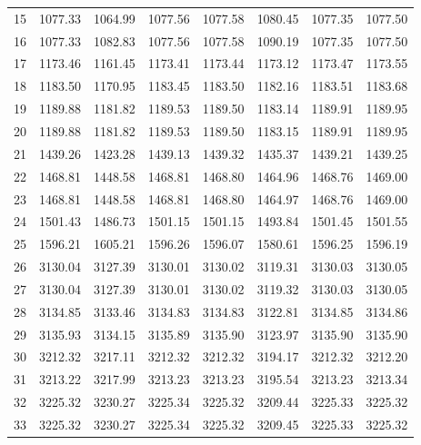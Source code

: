 \documentclass[10pt,oneside]{article}
\begin{document}
\begin{table}[h!]
\begin{tabular}{cccccccc}
15 &   1077.33 & 1064.99 & 1077.56 &    1077.58 &      1080.45 & 1077.35 &   1077.50 \\
16 &   1077.33 & 1082.83 & 1077.56 &    1077.58 &      1090.19 & 1077.35 &   1077.50 \\
17 &   1173.46 & 1161.45 & 1173.41 &    1173.44 &      1173.12 & 1173.47 &   1173.55 \\
18 &   1183.50 & 1170.95 & 1183.45 &    1183.50 &      1182.16 & 1183.51 &   1183.68 \\
19 &   1189.88 & 1181.82 & 1189.53 &    1189.50 &      1183.14 & 1189.91 &   1189.95 \\
20 &   1189.88 & 1181.82 & 1189.53 &    1189.50 &      1183.15 & 1189.91 &   1189.95 \\
21 &   1439.26 & 1423.28 & 1439.13 &    1439.32 &      1435.37 & 1439.21 &   1439.25 \\
22 &   1468.81 & 1448.58 & 1468.81 &    1468.80 &      1464.96 & 1468.76 &   1469.00 \\
23 &   1468.81 & 1448.58 & 1468.81 &    1468.80 &      1464.97 & 1468.76 &   1469.00 \\
24 &   1501.43 & 1486.73 & 1501.15 &    1501.15 &      1493.84 & 1501.45 &   1501.55 \\
25 &   1596.21 & 1605.21 & 1596.26 &    1596.07 &      1580.61 & 1596.25 &   1596.19 \\
26 &   3130.04 & 3127.39 & 3130.01 &    3130.02 &      3119.31 & 3130.03 &   3130.05 \\
27 &   3130.04 & 3127.39 & 3130.01 &    3130.02 &      3119.32 & 3130.03 &   3130.05 \\
28 &   3134.85 & 3133.46 & 3134.83 &    3134.83 &      3122.81 & 3134.85 &   3134.86 \\
29 &   3135.93 & 3134.15 & 3135.89 &    3135.90 &      3123.97 & 3135.90 &   3135.90 \\
30 &   3212.32 & 3217.11 & 3212.32 &    3212.32 &      3194.17 & 3212.32 &   3212.20 \\
31 &   3213.22 & 3217.99 & 3213.23 &    3213.23 &      3195.54 & 3213.23 &   3213.34 \\
32 &   3225.32 & 3230.27 & 3225.34 &    3225.32 &      3209.44 & 3225.33 &   3225.32 \\
33 &   3225.32 & 3230.27 & 3225.34 &    3225.32 &      3209.45 & 3225.33 &   3225.32 \\
\bottomrule
\end{tabular}
\end{table}
\end{document}
